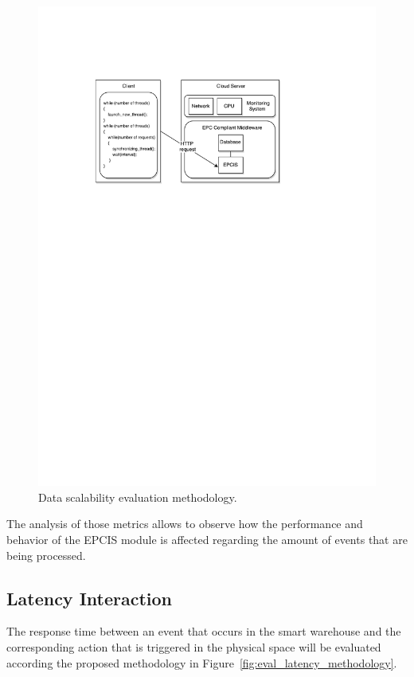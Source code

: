 \begin{figure}[ht!]
  \centering
  \includegraphics[width=.7\textwidth]{./images/eval_data_methodology}
  \caption{Data scalability evaluation methodology.}
  \label{fig:eval_data_methodology}
\end{figure}

The analysis of those metrics allows to observe how the performance and behavior of the \gls{EPCIS}
module is affected regarding the amount of events that are being processed.

\subsection{Latency Interaction}
\label{sub:eval_methodology_latency}
The response time between an event that occurs in the smart warehouse and the corresponding action
that is triggered in the physical space will be evaluated according the proposed methodology in Figure~\ref{fig:eval_latency_methodology}.\\

